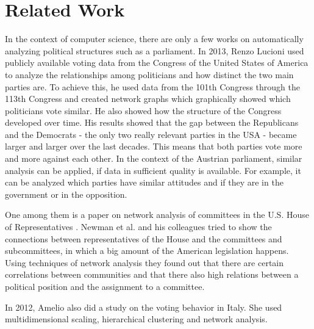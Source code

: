 \chapter{Related Work}
\label{chap:relatedwork}

In the context of computer science, there are only a few works on automatically analyzing political structures such as a parliament. In 2013, Renzo Lucioni \cite{Lucioni_2015} used publicly available voting data from the Congress of the United States of America to analyze the relationships among politicians and how distinct the two main parties are. To achieve this, he used data from the 101th Congress through the 113th Congress and created network graphs which graphically showed which politicians vote similar. He also showed how the structure of the Congress developed over time. His results showed that the gap between the Republicans and the Democrats - the only two really relevant parties in the USA - became larger and larger over the last decades. This means that both parties vote more and more against each other. In the context of the Austrian parliament, similar analysis can be applied, if data in sufficient quality is available. For example, it can be analyzed which parties have similar attitudes and if they are in the government or in the opposition.

One among them is a paper on network analysis of committees in the U.S. House of Representatives \cite{Porter_2005}. Newman et al. and his colleagues tried to show the connections between representatives of the House and the committees and subcommittees, in which a big amount of the American legislation happens. Using techniques of network analysis they found out that there are certain correlations between communities and that there also high relations between a political position and the assignment to a committee. 

In 2012, Amelio \cite{Amelio_2012} also did a study on the voting behavior in Italy. She used multidimensional scaling, hierarchical clustering and network analysis.






